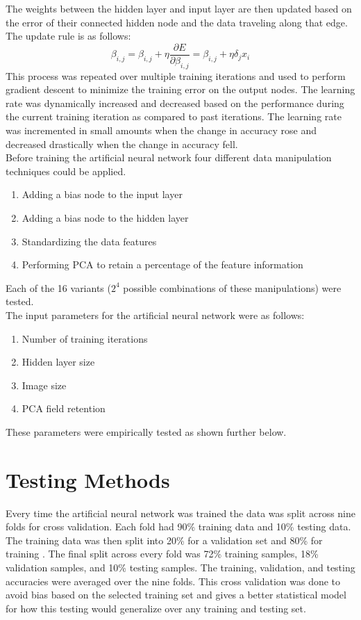 \documentclass[12pt]{article}
\begin{document}
The weights between the hidden layer and input layer are then updated based on the error of their connected hidden node and the data traveling along that edge. The update rule is as follows:\\
$$\beta_{i,j} = \beta_{i,j} + \eta \frac{\partial E}{\partial \beta_{i,j}} = \beta_{i,j} + \eta \delta_j x_i$$
This process was repeated over multiple training iterations and used to perform gradient descent to minimize the training error on the output nodes. The learning rate was dynamically increased and decreased based on the performance during the current training iteration as compared to past iterations. The learning rate was incremented in small amounts when the change in accuracy rose and decreased drastically when the change in accuracy fell. \cite{adaptivelearning}\\

Before training the artificial neural network four different data manipulation techniques could be applied.\\
\begin{enumerate}
\item Adding a bias node to the input layer
\item Adding a bias node to the hidden layer
\item Standardizing the data features
\item Performing PCA to retain a percentage of the feature information
\end{enumerate}

Each of the 16 variants ($2^4$ possible combinations of these manipulations) were tested.\\

The input parameters for the artificial neural network were as follows:
\begin{enumerate}
\item Number of training iterations
\item Hidden layer size
\item Image size
\item PCA field retention
\end{enumerate}

These parameters were empirically tested as shown further below.\\


\section{Testing Methods}
Every time the artificial neural network was trained the data was split across nine folds for cross validation. Each fold had 90\% training data and 10\% testing data. The training data was then split into 20\% for a validation set and 80\% for training \cite{deeplearning}. The final split across every fold was 72\% training samples, 18\% validation samples, and 10\% testing samples. The training, validation, and testing accuracies were averaged over the nine folds. This cross validation was done to avoid bias based on the selected training set and gives a better statistical model for how this testing would generalize over any training and testing set.\\
\end{document}
